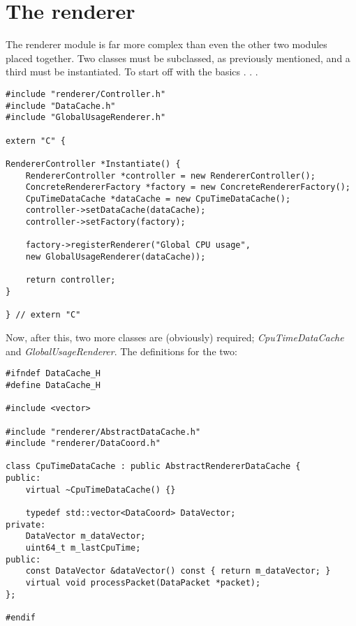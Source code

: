 \section{The renderer}
The renderer module is far more complex than even the other two modules placed together. Two classes must be
subclassed, as previously mentioned, and a third must be instantiated. To start off with the basics . . .

\begin{lstlisting}
#include "renderer/Controller.h"
#include "DataCache.h"
#include "GlobalUsageRenderer.h"

extern "C" {

RendererController *Instantiate() {
    RendererController *controller = new RendererController();
    ConcreteRendererFactory *factory = new ConcreteRendererFactory();
    CpuTimeDataCache *dataCache = new CpuTimeDataCache();
    controller->setDataCache(dataCache);
    controller->setFactory(factory);

    factory->registerRenderer("Global CPU usage",
	new GlobalUsageRenderer(dataCache));

    return controller;
}

} // extern "C"
\end{lstlisting}

Now, after this, two more classes are (obviously) required; \emph{CpuTimeDataCache} and \emph{GlobalUsageRenderer}. The
definitions for the two:

\begin{lstlisting}
#ifndef DataCache_H
#define DataCache_H

#include <vector>

#include "renderer/AbstractDataCache.h"
#include "renderer/DataCoord.h"

class CpuTimeDataCache : public AbstractRendererDataCache {
public:
    virtual ~CpuTimeDataCache() {}
    
    typedef std::vector<DataCoord> DataVector;
private:
    DataVector m_dataVector;
    uint64_t m_lastCpuTime;
public:
    const DataVector &dataVector() const { return m_dataVector; }
    virtual void processPacket(DataPacket *packet);
};

#endif

\end{lstlisting}

